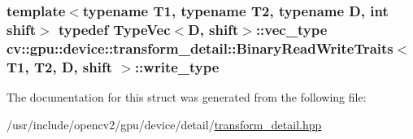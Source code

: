 \hypertarget{structcv_1_1gpu_1_1device_1_1transform__detail_1_1BinaryReadWriteTraits_afc503c7273d80dd10dd4ba7af5f91df9}{
\subsubsection[{write\-\_\-type}]{\setlength{\rightskip}{0pt plus 5cm}template$<$typename T1, typename T2, typename D, int shift$>$ typedef {\bf Type\-Vec}$<$D, shift$>$\-::vec\-\_\-type {\bf cv\-::gpu\-::device\-::transform\-\_\-detail\-::\-Binary\-Read\-Write\-Traits}$<$ T1, T2, D, shift $>$\-::{\bf write\-\_\-type}}}\label{structcv_1_1gpu_1_1device_1_1transform__detail_1_1BinaryReadWriteTraits_afc503c7273d80dd10dd4ba7af5f91df9}


The documentation for this struct was generated from the following file\-:\begin{DoxyCompactItemize}
\item 
/usr/include/opencv2/gpu/device/detail/\hyperlink{transform__detail_8hpp}{transform\-\_\-detail.\-hpp}\end{DoxyCompactItemize}
